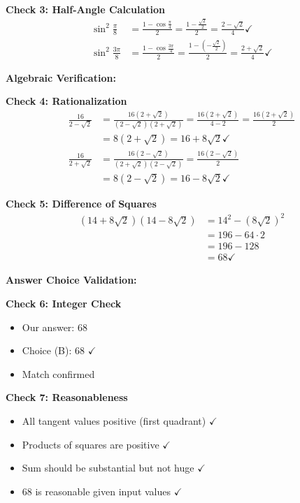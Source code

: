 \documentclass[12pt]{article}
\begin{document}
\begin{verificationbox}
\textbf{Check 3: Half-Angle Calculation}
\begin{align*}
\sin^2\frac{\pi}{8} &= \frac{1-\cos\frac{\pi}{4}}{2} = \frac{1-\frac{\sqrt{2}}{2}}{2} = \frac{2-\sqrt{2}}{4} \checkmark \\
\sin^2\frac{3\pi}{8} &= \frac{1-\cos\frac{3\pi}{4}}{2} = \frac{1-(-\frac{\sqrt{2}}{2})}{2} = \frac{2+\sqrt{2}}{4} \checkmark
\end{align*}

\textbf{Algebraic Verification:}

\textbf{Check 4: Rationalization}
\begin{align*}
\frac{16}{2-\sqrt{2}} &= \frac{16(2+\sqrt{2})}{(2-\sqrt{2})(2+\sqrt{2})} = \frac{16(2+\sqrt{2})}{4-2} = \frac{16(2+\sqrt{2})}{2} \\
&= 8(2+\sqrt{2}) = 16 + 8\sqrt{2} \checkmark \\
\frac{16}{2+\sqrt{2}} &= \frac{16(2-\sqrt{2})}{(2+\sqrt{2})(2-\sqrt{2})} = \frac{16(2-\sqrt{2})}{2} \\
&= 8(2-\sqrt{2}) = 16 - 8\sqrt{2} \checkmark
\end{align*}

\textbf{Check 5: Difference of Squares}
\begin{align*}
(14 + 8\sqrt{2})(14 - 8\sqrt{2}) &= 14^2 - (8\sqrt{2})^2 \\
&= 196 - 64 \cdot 2 \\
&= 196 - 128 \\
&= 68 \checkmark
\end{align*}

\textbf{Answer Choice Validation:}

\textbf{Check 6: Integer Check}
\begin{itemize}
    \item Our answer: 68
    \item Choice (B): 68 $\checkmark$
    \item Match confirmed
\end{itemize}

\textbf{Check 7: Reasonableness}
\begin{itemize}
    \item All tangent values positive (first quadrant) $\checkmark$
    \item Products of squares are positive $\checkmark$
    \item Sum should be substantial but not huge $\checkmark$
    \item 68 is reasonable given input values $\checkmark$
\end{itemize}


\end{verificationbox}
\end{document}
